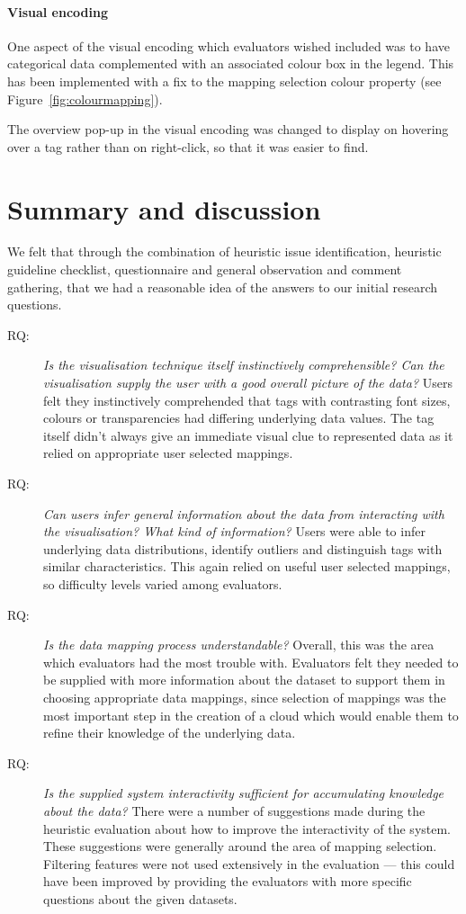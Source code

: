 \paragraph{Visual encoding}

One aspect of the visual encoding which evaluators wished included was to have categorical data complemented with an associated colour box in the legend. This has been implemented with a fix to the mapping selection colour property (see Figure~\vref{fig:colourmapping}).
 
The overview pop-up in the visual encoding was changed to display on hovering over a tag rather than on right-click, so that it was easier to find.

\section{Summary and discussion}\label{sect:heuristicconclusion}

We felt that through the combination of heuristic issue identification, heuristic guideline checklist, questionnaire and general observation and comment gathering, that we had a reasonable idea of the answers to our initial research questions.

\begin{description}
  \item[RQ:]\textit{Is the visualisation technique itself instinctively comprehensible? Can the visualisation supply the user with a good overall picture of the data?} Users felt they instinctively comprehended that tags with contrasting font sizes, colours or transparencies had differing underlying data values. The tag itself didn't always give an immediate visual clue to represented data as it relied on appropriate user selected mappings.
  \item[RQ:]\textit{Can users infer general information about the data from interacting with the visualisation? What kind of information? } Users were able to infer underlying data distributions, identify outliers and distinguish tags with similar characteristics. This again relied on useful user selected mappings, so difficulty levels varied among evaluators. 
  \item[RQ:]\textit{Is the data mapping process understandable?} Overall, this was the area which evaluators had the most trouble with. Evaluators felt they needed to be supplied with more information about the dataset to support them in choosing appropriate data mappings, since selection of mappings was the most important step in the creation of a cloud which would enable them to refine their knowledge of the underlying data.
  \item[RQ:]\textit{Is the supplied system interactivity sufficient for accumulating knowledge about the data?} There were a number of suggestions made during the heuristic evaluation about how to improve the interactivity of the system. These suggestions were generally around the area of mapping selection. Filtering features were not used extensively in the evaluation --- this could have been improved by providing the evaluators with more specific questions about the given datasets.  
\end{description}

